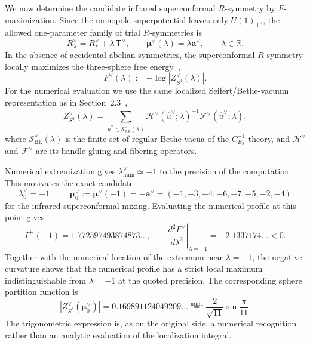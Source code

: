 \documentclass[11pt,a4paper]{article}
\numberwithin{equation}{section}
\begin{document}
We now determine the candidate infrared superconformal $R$-symmetry by $F$-maximization.  Since the monopole superpotential leaves only $U(1)_{\mathsf T^\vee}$, the allowed one-parameter family of trial $R$-symmetries is
\begin{equation}
  R_\lambda^\vee
  =R_*^\vee+\lambda\,\mathsf T^\vee,
  \qquad
  \boldsymbol\mu^\vee(\lambda)
  =\lambda\boldsymbol a^\vee,
  \qquad
  \lambda\in\mathbb R.
  \label{eq:dual-Fmax-family}
\end{equation}
In the absence of accidental abelian symmetries, the superconformal $R$-symmetry locally maximizes the three-sphere free energy~\cite{Jafferis:2010un},
\begin{equation}
  F^\vee(\lambda)
  :=-\log\left|Z_{S^3}^\vee(\lambda)\right|.
  \label{eq:dual-F-def}
\end{equation}
For the numerical evaluation we use the same localized Seifert/Bethe-vacuum representation as in Section~2.3~\cite{Closset:2017zgf},
\begin{equation}
  Z_{S^3}^\vee(\lambda)
  =\sum_{\widehat u^\vee\in\mathcal S_{\mathrm{BE}}^\vee(\lambda)}
  \mathcal H^\vee(\widehat u^\vee;\lambda)^{-1}
  \mathcal F^\vee(\widehat u^\vee;\lambda),
  \label{eq:dual-S3-Bethe-formula}
\end{equation}
where $\mathcal S_{\mathrm{BE}}^\vee(\lambda)$ is the finite set of regular Bethe vacua of the $C_{E_8}^{-1}$ theory, and $\mathcal H^\vee$ and $\mathcal F^\vee$ are its handle-gluing and fibering operators.

Numerical extremization gives $\lambda_{\mathrm{num}}^\vee\simeq-1$ to the precision of the computation.  This motivates the exact candidate
\begin{equation}
  \lambda_0^\vee=-1,
  \qquad
  \boldsymbol\mu_0^\vee
  :=\boldsymbol\mu^\vee(-1)
  =-\boldsymbol a^\vee
  =(-1,-3,-4,-6,-7,-5,-2,-4)
  \label{eq:dual-exact-mixing-candidate}
\end{equation}
for the infrared superconformal mixing.  Evaluating the numerical profile at this point gives
\begin{equation}
  F^\vee(-1)=1.772597493874873\ldots,
  \qquad
  \left.\frac{d^2F^\vee}{d\lambda^2}\right|_{\lambda=-1}
  =-2.1337174\ldots<0.
  \label{eq:dual-Fmax-curvature}
\end{equation}
Together with the numerical location of the extremum near $\lambda=-1$, the negative curvature shows that the numerical profile has a strict local maximum indistinguishable from $\lambda=-1$ at the quoted precision.  The corresponding sphere partition function is
\begin{equation}
  \left|Z_{S^3}^\vee(\boldsymbol\mu_0^\vee)\right|
  =0.169891124049209\ldots
  \stackrel{\mathrm{num.}}{=}
  \frac{2}{\sqrt{11}}\sin\frac{\pi}{11}.
  \label{eq:dual-S3-value}
\end{equation}
The trigonometric expression is, as on the original side, a numerical recognition rather than an analytic evaluation of the localization integral.
\end{document}
